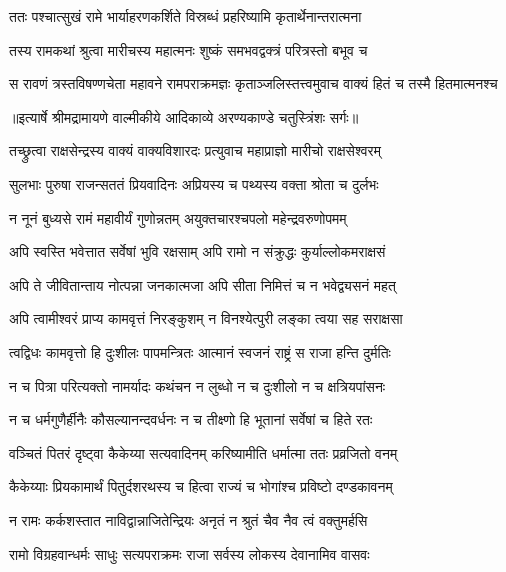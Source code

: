 \twolineshloka
{ततः पश्चात्सुखं रामे भार्याहरणकर्शिते}
{विस्रब्धं प्रहरिष्यामि कृतार्थेनान्तरात्मना} %

\twolineshloka
{तस्य रामकथां श्रुत्वा मारीचस्य महात्मनः}
{शुष्कं समभवद्वक्त्रं परित्रस्तो बभूव च} %

\fourlineindentedshloka
{स रावणं त्रस्तविषण्णचेता}
{ महावने रामपराक्रमज्ञः}
{कृताञ्जलिस्तत्त्वमुवाच वाक्यं}
{ हितं च तस्मै हितमात्मनश्च} %


{॥इत्यार्षे श्रीमद्रामायणे वाल्मीकीये आदिकाव्ये अरण्यकाण्डे चतुस्त्रिंशः सर्गः॥}


\twolineshloka
{तच्छ्रुत्वा राक्षसेन्द्रस्य वाक्यं वाक्यविशारदः}
{प्रत्युवाच महाप्राज्ञो मारीचो राक्षसेश्वरम्} %

\twolineshloka
{सुलभाः पुरुषा राजन्सततं प्रियवादिनः}
{अप्रियस्य च पथ्यस्य वक्ता श्रोता च दुर्लभः} %

\twolineshloka
{न नूनं बुध्यसे रामं महावीर्यं गुणोन्नतम्}
{अयुक्तचारश्चपलो महेन्द्रवरुणोपमम्} %

\twolineshloka
{अपि स्वस्ति भवेत्तात सर्वेषां भुवि रक्षसाम्}
{अपि रामो न संक्रुद्धः कुर्याल्लोकमराक्षसं} %

\twolineshloka
{अपि ते जीवितान्ताय नोत्पन्ना जनकात्मजा}
{अपि सीता निमित्तं च न भवेद्व्यसनं महत्} %

\twolineshloka
{अपि त्वामीश्वरं प्राप्य कामवृत्तं निरङ्कुशम्}
{न विनश्येत्पुरी लङ्का त्वया सह सराक्षसा} %

\twolineshloka
{त्वद्विधः कामवृत्तो हि दुःशीलः पापमन्त्रितः}
{आत्मानं स्वजनं राष्ट्रं स राजा हन्ति दुर्मतिः} %

\twolineshloka
{न च पित्रा परित्यक्तो नामर्यादः कथंचन}
{न लुब्धो न च दुःशीलो न च क्षत्रियपांसनः} %

\twolineshloka
{न च धर्मगुणैर्हीनैः कौसल्यानन्दवर्धनः}
{न च तीक्ष्णो हि भूतानां सर्वेषां च हिते रतः} %

\twolineshloka
{वञ्चितं पितरं दृष्ट्वा कैकेय्या सत्यवादिनम्}
{करिष्यामीति धर्मात्मा ततः प्रव्रजितो वनम्} %

\twolineshloka
{कैकेय्याः प्रियकामार्थं पितुर्दशरथस्य च}
{हित्वा राज्यं च भोगांश्च प्रविष्टो दण्डकावनम्} %

\twolineshloka
{न रामः कर्कशस्तात नाविद्वान्नाजितेन्द्रियः}
{अनृतं न श्रुतं चैव नैव त्वं वक्तुमर्हसि} %

\twolineshloka
{रामो विग्रहवान्धर्मः साधुः सत्यपराक्रमः}
{राजा सर्वस्य लोकस्य देवानामिव वासवः} %

